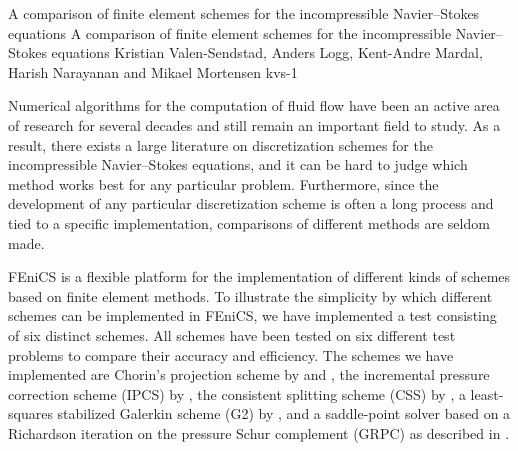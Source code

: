               {A comparison of finite element schemes for the incompressible
                 Navier--Stokes equations}
              {A comparison of finite element schemes for the incompressible
                 Navier--Stokes equations}
              {Kristian Valen-Sendstad, Anders Logg, Kent-Andre Mardal,
               Harish Narayanan and Mikael Mortensen}
              {kvs-1}

\newcommand{\css}[1]{$\mathrm{CSS}_{#1}$}

\newcommand{\scheme}[3]{%
\begin{figure}
  \center
  \ffigbox{}{
    \small
    \begin{tabular}{l}
      \toprule
      \textbf{Scheme #1:} #2 \\
      \midrule
      \begin{minipage}{\fullfig}
        \vspace{0.1cm}
        \begin{enumerate}
          #3
        \end{enumerate}
        \vspace{0.1cm}
      \end{minipage} \\
      \bottomrule
    \end{tabular}
    \normalsize
  }
\end{figure}}


Numerical algorithms for the computation of fluid flow have been an
active area of research for several decades and still remain an
important field to study. As a result, there exists a large literature
on discretization schemes for the incompressible Navier--Stokes
equations, and it can be hard to judge which method works best for any
particular problem. Furthermore, since the development of any
particular discretization scheme is often a long process and tied to a
specific implementation, comparisons of different methods are seldom
made.

FEniCS is a flexible platform for the implementation of different
kinds of schemes based on finite element methods. To illustrate the
simplicity by which different schemes can be implemented in FEniCS, we
have implemented a test consisting of six distinct schemes. All
schemes have been tested on six different test problems to compare
their accuracy and efficiency. The schemes we have implemented are
Chorin's projection scheme by \citet{Chorin1968} and
\citet{Temam1969}, the incremental pressure correction scheme (IPCS)
by \citet{Goda1979}, the consistent splitting scheme (CSS) by
\citet{GuermondMinevShen2006}, a least-squares stabilized Galerkin
scheme (G2) by \citet{HoffmanJohnson2007}, and a saddle-point solver
based on a Richardson iteration on the pressure Schur complement
(GRPC) as described in \citet{Turek1996}.

